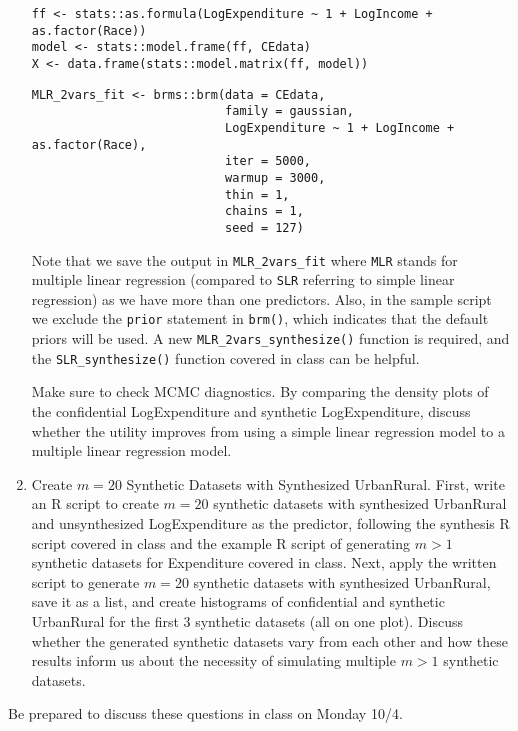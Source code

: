 \documentclass[11pt]{article}
\begin{document}
\begin{enumerate}
\begin{verbatim}
ff <- stats::as.formula(LogExpenditure ~ 1 + LogIncome + as.factor(Race))
model <- stats::model.frame(ff, CEdata)
X <- data.frame(stats::model.matrix(ff, model))
\end{verbatim}

\begin{verbatim}
MLR_2vars_fit <- brms::brm(data = CEdata, 
                           family = gaussian,
                           LogExpenditure ~ 1 + LogIncome + as.factor(Race),
                           iter = 5000, 
                           warmup = 3000, 
                           thin = 1, 
                           chains = 1, 
                           seed = 127)
\end{verbatim}

Note that we save the output in \texttt{MLR\_2vars\_fit} where \texttt{MLR} stands for multiple linear regression (compared to \texttt{SLR} referring to simple linear regression) as we have more than one predictors. Also, in the sample script we exclude the \texttt{prior} statement in \texttt{brm()}, which indicates that the default priors will be used. A new \texttt{MLR\_2vars\_synthesize()} function is required, and the \texttt{SLR\_synthesize()} function covered in class can be helpful.

Make sure to check MCMC diagnostics. By comparing the density plots of the confidential LogExpenditure and synthetic LogExpenditure, discuss whether the utility improves from using a simple linear regression model to a multiple linear regression model.

\item Create $m = 20$ Synthetic Datasets with Synthesized UrbanRural. First, write an R script to create $m = 20$ synthetic datasets with synthesized UrbanRural and unsynthesized LogExpenditure as the predictor, following the synthesis R script covered in class and the example R script of generating $m > 1$ synthetic datasets for Expenditure covered in class. Next, apply the written script to generate $m = 20$ synthetic datasets with synthesized UrbanRural, save it as a list, and create histograms of confidential and synthetic UrbanRural for the first 3 synthetic datasets (all on one plot). Discuss whether the generated synthetic datasets vary from each other and how these results inform us about the necessity of simulating multiple $m > 1$ synthetic datasets.


\end{enumerate}

Be prepared to discuss these questions in class on Monday 10/4.
\end{document}
